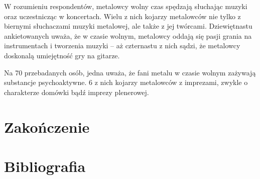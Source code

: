 \documentclass[12pt, a4paper, titlepage]{report}
\begin{document}
W rozumieniu respondentów, metalowcy wolny czas spędzają słuchając muzyki oraz uczestnicząc w koncertach. Wielu z nich kojarzy metalowców nie tylko z biernymi słuchaczami muzyki metalowej, ale także z jej twórcami. Dziewiętnastu ankietowanych uważa, że w czasie wolnym, metalowcy oddają się pasji grania na instrumentach i tworzenia muzyki -- aż czternastu z nich sądzi, że metalowcy doskonalą umiejętność gry na gitarze. 

Na 70 przebadanych osób, jedna uważa, że fani metalu w czasie wolnym zażywają substancje psychoaktywne. 6 z nich kojarzy metalowców z imprezami, zwykle o charakterze domówki bądź imprezy plenerowej. 



\chapter*{Zakończenie}
\chapter*{Bibliografia}
\end{document}
